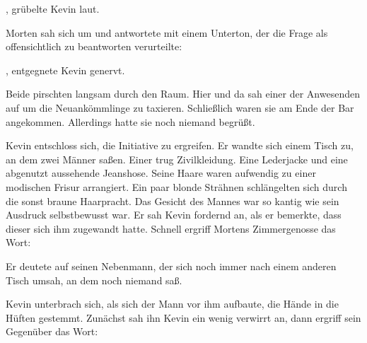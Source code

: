 \par

, grübelte Kevin laut.

\par

Morten sah sich um und antwortete mit einem Unterton, der die Frage als offensichtlich zu beantworten verurteilte: 

\par

, entgegnete Kevin genervt. 

\par

Beide pirschten langsam durch den Raum. Hier und da sah einer der Anwesenden auf um die Neuankömmlinge zu taxieren. Schließlich waren sie am Ende der Bar angekommen. Allerdings hatte sie noch niemand begrüßt.

\par

Kevin entschloss sich, die Initiative zu ergreifen. Er wandte sich einem Tisch zu, an dem zwei Männer saßen. Einer trug Zivilkleidung. Eine Lederjacke und eine abgenutzt aussehende Jeanshose. Seine Haare waren aufwendig zu einer modischen Frisur arrangiert. Ein paar blonde Strähnen schlängelten sich durch die sonst braune Haarpracht. Das Gesicht des Mannes war so kantig wie sein Ausdruck selbstbewusst war. Er sah Kevin fordernd an, als er bemerkte, dass dieser sich ihm zugewandt hatte. Schnell ergriff Mortens Zimmergenosse das Wort: 

\par

Er deutete auf seinen Nebenmann, der sich noch immer nach einem anderen Tisch umsah, an dem noch niemand saß. 

\par

Kevin unterbrach sich, als sich der Mann vor ihm aufbaute, die Hände in die Hüften gestemmt. Zunächst sah ihn Kevin ein wenig verwirrt an, dann ergriff sein Gegenüber das Wort: 

\par

